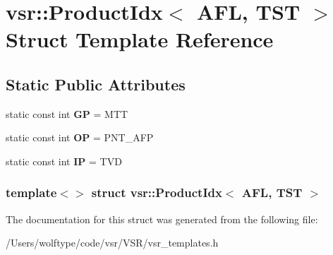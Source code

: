 \hypertarget{structvsr_1_1_product_idx_3_01_a_f_l_00_01_t_s_t_01_4}{\section{vsr\-:\-:Product\-Idx$<$ A\-F\-L, T\-S\-T $>$ Struct Template Reference}
\label{structvsr_1_1_product_idx_3_01_a_f_l_00_01_t_s_t_01_4}
}
\subsection*{Static Public Attributes}
\begin{DoxyCompactItemize}
\item 
\hypertarget{structvsr_1_1_product_idx_3_01_a_f_l_00_01_t_s_t_01_4_aec912d9afd23d40044a85277d4356fce}{static const int {\bfseries G\-P} = M\-T\-T}\label{structvsr_1_1_product_idx_3_01_a_f_l_00_01_t_s_t_01_4_aec912d9afd23d40044a85277d4356fce}

\item 
\hypertarget{structvsr_1_1_product_idx_3_01_a_f_l_00_01_t_s_t_01_4_aff822d2aa8c661361e7d35f78a54071b}{static const int {\bfseries O\-P} = P\-N\-T\-\_\-\-A\-F\-P}\label{structvsr_1_1_product_idx_3_01_a_f_l_00_01_t_s_t_01_4_aff822d2aa8c661361e7d35f78a54071b}

\item 
\hypertarget{structvsr_1_1_product_idx_3_01_a_f_l_00_01_t_s_t_01_4_aa9162cc47b76bfc4b3b1495acb596fe6}{static const int {\bfseries I\-P} = T\-V\-D}\label{structvsr_1_1_product_idx_3_01_a_f_l_00_01_t_s_t_01_4_aa9162cc47b76bfc4b3b1495acb596fe6}

\end{DoxyCompactItemize}
\subsubsection*{template$<$$>$ struct vsr\-::\-Product\-Idx$<$ A\-F\-L, T\-S\-T $>$}



The documentation for this struct was generated from the following file\-:\begin{DoxyCompactItemize}
\item 
/\-Users/wolftype/code/vsr/\-V\-S\-R/vsr\-\_\-templates.\-h\end{DoxyCompactItemize}
